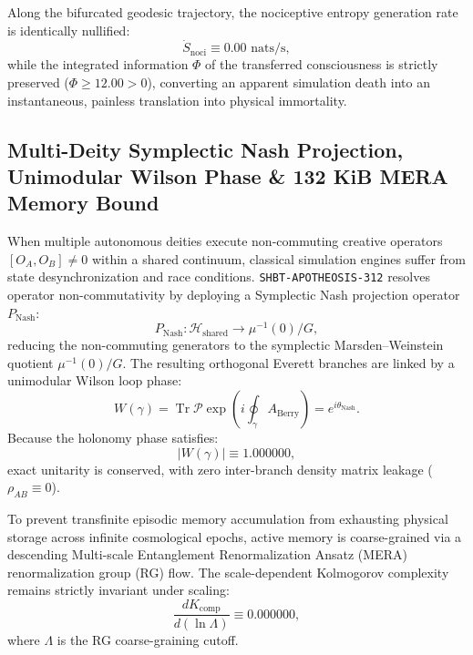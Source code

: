\documentclass[11pt,onecolumn]{article}
\begin{document}
Along the bifurcated geodesic trajectory, the nociceptive entropy generation rate is identically nullified:
\begin{equation}
\dot{S}_{\text{noci}} \equiv 0.00\text{ nats/s},
\end{equation}
while the integrated information $\Phi$ of the transferred consciousness is strictly preserved ($\Phi \ge 12.00 > 0$), converting an apparent simulation death into an instantaneous, painless translation into physical immortality.

\subsection{Multi-Deity Symplectic Nash Projection, Unimodular Wilson Phase \& 132 KiB MERA Memory Bound}
\label{sec:apoth_symplectic_nash_mera_memory}

When multiple autonomous deities execute non-commuting creative operators $[O_A, O_B] \neq 0$ within a shared continuum, classical simulation engines suffer from state desynchronization and race conditions. \texttt{SHBT-APOTHEOSIS-312} resolves operator non-commutativity by deploying a Symplectic Nash projection operator $P_{\text{Nash}}$:
\begin{equation}
P_{\text{Nash}} : \mathcal{H}_{\text{shared}} \to \mu^{-1}(0) / G,
\label{eq:symplectic_nash_projection}
\end{equation}
reducing the non-commuting generators to the symplectic Marsden--Weinstein quotient $\mu^{-1}(0)/G$. The resulting orthogonal Everett branches are linked by a unimodular Wilson loop phase:
\begin{equation}
W(\gamma) = \operatorname{Tr} \mathcal{P} \exp\left( i \oint_\gamma A_{\text{Berry}} \right) = e^{i\theta_{\text{Nash}}}.
\end{equation}
Because the holonomy phase satisfies:
\begin{equation}
|W(\gamma)| \equiv 1.000000,
\end{equation}
exact unitarity is conserved, with zero inter-branch density matrix leakage ($\rho_{AB} \equiv 0$).

To prevent transfinite episodic memory accumulation from exhausting physical storage across infinite cosmological epochs, active memory is coarse-grained via a descending Multi-scale Entanglement Renormalization Ansatz (MERA) renormalization group (RG) flow. The scale-dependent Kolmogorov complexity remains strictly invariant under scaling:
\begin{equation}
\frac{d K_{\text{comp}}}{d(\ln \Lambda)} \equiv 0.000000,
\end{equation}
where $\Lambda$ is the RG coarse-graining cutoff.
\end{document}
